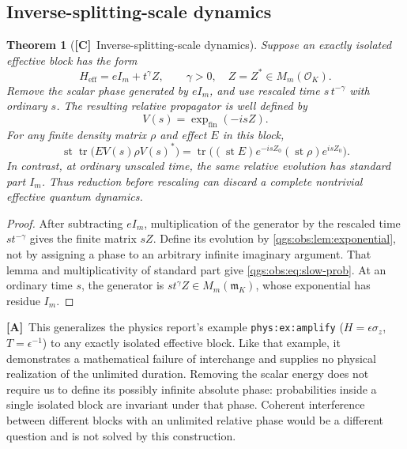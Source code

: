 \documentclass[11pt,oneside]{article}
\numberwithin{equation}{section}
\theoremstyle{plain}
\newtheorem{theorem}{Theorem}[section]
\theoremstyle{definition}
\theoremstyle{remark}
\newcommand{\OO}{\mathcal O}
\newcommand{\mm}{\mathfrak m}
\newcommand{\Heff}{H_{\mathrm{eff}}}
\newcommand{\expfin}{\exp_{\mathrm{fin}}}
\DeclareMathOperator{\st}{st}
\DeclareMathOperator{\tr}{tr}
\newcommand{\TC}{\textcolor{TierC}{\textsf{\bfseries[C]}}}
\newcommand{\TA}{\textcolor{TierA}{\textsf{\bfseries[A]}}}
\begin{document}
\subsection{Inverse-splitting-scale dynamics}
\begin{theorem}[\TC\ Inverse-splitting-scale dynamics]\label{qgs:obs:thm:dynamics}
Suppose an exactly isolated effective block has the form
\begin{equation}\label{qgs:obs:eq:slowH}
 \Heff=eI_m+t^\gamma Z,\qquad \gamma>0,\quad Z=Z^*\in M_m(\OO_K).
\end{equation}
Remove the scalar phase generated by $eI_m$, and use rescaled time $s\,t^{-\gamma}$ with ordinary $s$. The resulting relative propagator is well defined by
\begin{equation}\label{qgs:obs:eq:slow-prop}
 V(s)=\expfin(-isZ).
\end{equation}
For any finite density matrix $\rho$ and effect $E$ in this block,
\begin{equation}\label{qgs:obs:eq:slow-prob}
 \st\tr\bigl(EV(s)\rho V(s)^*\bigr)
 =\tr\bigl((\st E)e^{-isZ_0}(\st\rho)e^{isZ_0}\bigr).
\end{equation}
In contrast, at ordinary unscaled time, the same relative evolution has standard part $I_m$. Thus reduction before rescaling can discard a complete nontrivial effective quantum dynamics.
\end{theorem}
\begin{proof}
After subtracting $eI_m$, multiplication of the generator by the rescaled time $s t^{-\gamma}$ gives the finite matrix $sZ$. Define its evolution by \cref{qgs:obs:lem:exponential}, not by assigning a phase to an arbitrary infinite imaginary argument. That lemma and multiplicativity of standard part give \eqref{qgs:obs:eq:slow-prob}. At an ordinary time $s$, the generator is $s t^\gamma Z\in M_m(\mm_K)$, whose exponential has residue $I_m$.
\end{proof}

\TA\ This generalizes the physics report's example \texttt{phys:ex:amplify} ($H=\epsilon\sigma_z$, $T=\epsilon^{-1}$) to any exactly isolated effective block. Like that example, it demonstrates a mathematical failure of interchange and supplies no physical realization of the unlimited duration. Removing the scalar energy does not require us to define its possibly infinite absolute phase: probabilities inside a single isolated block are invariant under that phase. Coherent interference between different blocks with an unlimited relative phase would be a different question and is not solved by this construction.
\end{document}
